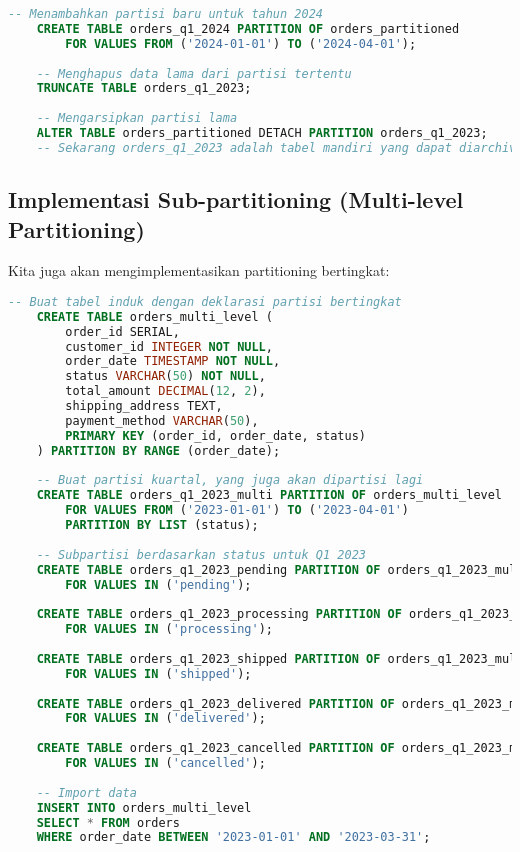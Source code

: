\begin{lstlisting}[language=SQL]
	-- Menambahkan partisi baru untuk tahun 2024
	CREATE TABLE orders_q1_2024 PARTITION OF orders_partitioned
		FOR VALUES FROM ('2024-01-01') TO ('2024-04-01');
	
	-- Menghapus data lama dari partisi tertentu
	TRUNCATE TABLE orders_q1_2023;
	
	-- Mengarsipkan partisi lama
	ALTER TABLE orders_partitioned DETACH PARTITION orders_q1_2023;
	-- Sekarang orders_q1_2023 adalah tabel mandiri yang dapat diarchive
\end{lstlisting}

\subsection{Implementasi Sub-partitioning (Multi-level Partitioning)}
Kita juga akan mengimplementasikan partitioning bertingkat:

\begin{lstlisting}[language=SQL]
	-- Buat tabel induk dengan deklarasi partisi bertingkat
	CREATE TABLE orders_multi_level (
		order_id SERIAL,
		customer_id INTEGER NOT NULL,
		order_date TIMESTAMP NOT NULL,
		status VARCHAR(50) NOT NULL,
		total_amount DECIMAL(12, 2),
		shipping_address TEXT,
		payment_method VARCHAR(50),
		PRIMARY KEY (order_id, order_date, status)
	) PARTITION BY RANGE (order_date);
	
	-- Buat partisi kuartal, yang juga akan dipartisi lagi
	CREATE TABLE orders_q1_2023_multi PARTITION OF orders_multi_level
		FOR VALUES FROM ('2023-01-01') TO ('2023-04-01')
		PARTITION BY LIST (status);
	
	-- Subpartisi berdasarkan status untuk Q1 2023
	CREATE TABLE orders_q1_2023_pending PARTITION OF orders_q1_2023_multi
		FOR VALUES IN ('pending');
	
	CREATE TABLE orders_q1_2023_processing PARTITION OF orders_q1_2023_multi
		FOR VALUES IN ('processing');
	
	CREATE TABLE orders_q1_2023_shipped PARTITION OF orders_q1_2023_multi
		FOR VALUES IN ('shipped');
	
	CREATE TABLE orders_q1_2023_delivered PARTITION OF orders_q1_2023_multi
		FOR VALUES IN ('delivered');
	
	CREATE TABLE orders_q1_2023_cancelled PARTITION OF orders_q1_2023_multi
		FOR VALUES IN ('cancelled');
	
	-- Import data
	INSERT INTO orders_multi_level
	SELECT * FROM orders 
	WHERE order_date BETWEEN '2023-01-01' AND '2023-03-31';
\end{lstlisting}

